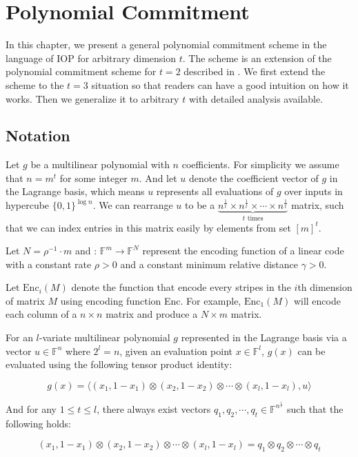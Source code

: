 \chapter{Polynomial Commitment}

In this chapter, we present a general polynomial commitment scheme in the language of IOP for arbitrary dimension $t$. The scheme is an extension of the polynomial commitment scheme for $t=2$ described in \cite{brakedown}. We first extend the scheme to the $t=3$ situation so that readers can have a good intuition on how it works. Then we generalize it to arbitrary $t$ with detailed analysis available.

\section{Notation}

Let $g$ be a multilinear polynomial with $n$ coefficients. For simplicity we assume that $n = m^t$ for some integer $m$. And let $u$ denote the coefficient vector of $g$ in the Lagrange basis, which means $u$ represents all evaluations of $g$ over inputs in hypercube $\{0, 1\}^{\log n}$. 
We can rearrange $u$ to be a $\underbrace{n^{\frac{1}{t}} \times n^{\frac{1}{t}} \times \cdots \times n^{\frac{1}{t}}}_{t \text{ times}}$ matrix, such that we can index entries in this matrix easily by elements from set $[m]^t$.

Let $N = \rho^{-1} \cdot m$ and : $\mathbb{F}^m \rightarrow \mathbb{F}^N$ represent the encoding function of a linear code with a constant rate $\rho > 0$ and a constant minimum relative distance $\gamma > 0$.

Let $\text{Enc}_i(M)$ denote the function that encode every stripes in the $i$th dimension of matrix $M$ using encoding function Enc. For example, $\text{Enc}_1(M)$ will encode each column of a $n \times n $ matrix and produce a $N \times m$ matrix.

\begin{lemma}
\label{lemma:petq}

For an $l$-variate multilinear polynomial $g$ represented in the Lagrange basis via a vector $u \in \mathbb{F}^{n}$ where $2^l = n$, given an evaluation point $x \in \mathbb{F}^l$, $g(x)$ can be evaluated using the following tensor product identity: 

\[
    g(x) = \langle (x_1, 1-x_1) \otimes (x_2, 1-x_2) \otimes \cdots \otimes (x_l, 1-x_l) , u \rangle
\]

And for any $ 1 \le t  \le l$, there always exist vectors $q_1, q_2, \cdots , q_t \in \mathbb{F}^{n^{\frac{1}{t}}}$ such that the following holds:

\[
    (x_1, 1-x_1) \otimes (x_2, 1-x_2) \otimes \cdots \otimes (x_l, 1-x_l) = q_1 \otimes q_2 \otimes \cdots \otimes q_t
\]

\end{lemma}

